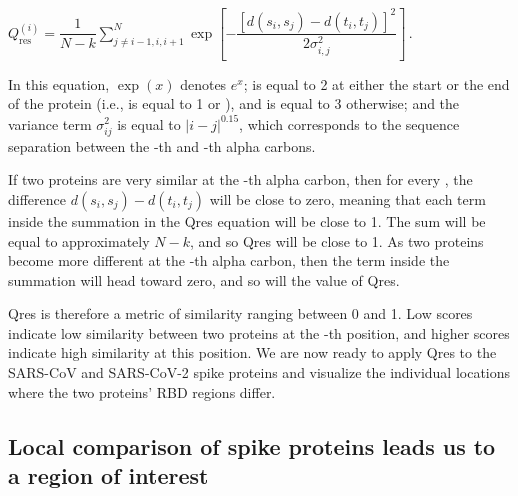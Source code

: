 \begin{center}
$Q_{\text{res}}^{(i)} = \dfrac{1}{N-k} \displaystyle \sum^{N}_{j\neq i-1,i,i+1} \exp\left[-\dfrac{[d(s_i,s_j)-d(t_i,t_j)]^2}{2\sigma^2_{i,j}}\right]$\,.
\end{center}

\noindent In this equation, $\exp(x)$ denotes $e^{x}$;  is equal to 2 at either the start or the end of the protein (i.e.,  is equal to 1 or ), and  is equal to 3 otherwise; and the variance term $\sigma_{ij}^2$ is equal to $\left\lvert{i-j}\right\rvert ^{0.15}$, which corresponds to the sequence separation between the -th and -th alpha carbons.\\

\begin{note}\end{note}

If two proteins are very similar at the -th alpha carbon, then for every , the difference $d(s_{i}, s_{j}) - d(t_{i}, t_{j})$ will be close to zero, meaning that each term inside the summation in the Qres equation will be close to 1. The sum will be equal to approximately $N - k$, and so Qres will be close to 1. As two proteins become more different at the -th alpha carbon, then the term inside the summation will head toward zero, and so will the value of Qres.

Qres is therefore a metric of similarity ranging between 0 and 1. Low scores indicate low similarity between two proteins at the -th position, and higher scores indicate high similarity at this position. We are now ready to apply Qres to the SARS-CoV and SARS-CoV-2 spike proteins and visualize the individual locations where the two proteins' RBD regions differ.

\FloatBarrier
{}
\subsection{Local comparison of spike proteins leads us to a region of interest}

